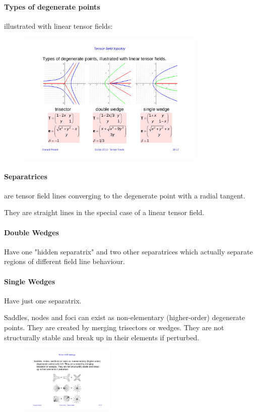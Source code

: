 \paragraph{Types of degenerate points} illustrated with linear tensor fields:
\begin{figure}[H]
    \centering
    \includegraphics[width=0.8\textwidth]{img/10_tensor_field_degenerate_points}
\end{figure}

\paragraph{Separatrices} are tensor field lines converging to the degenerate point with a radial tangent.  

They are straight lines in the special case of a linear tensor field.

\paragraph{Double Wedges} Have one "hidden separatrix" and two other separatrices which actually separate regions of different field line behaviour. 

\paragraph{Single Wedges} Have just one separatrix.

Saddles, nodes and foci can exist as non-elementary (higher-order) degenerate points. They are created by merging trisectors or wedges. They are not structurally stable and break up in their elements if perturbed. 
\begin{figure}[H]
\centering
\includegraphics[width=0.4\textwidth]{img/10_merging_tensor_fields}
\end{figure}

